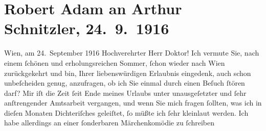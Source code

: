 

         
         \newcommand{\erwaehntePersonen}{Personen: Charles de Coster, Alexandre père Dumas,  G. Lenotre, Ricarda Huch, Viktor Franz Patzner}
         \newcommand{\erwaehnteOrte}{Orte: Wien}
         \newcommand{\erwaehnteWerke}{Werke: Bleus, Blancs et Rouges, Der große Krieg in Deutschland, Jean Christophe, Le mariage de Monsieur de Bréchard, Meine Memoiren, Märchenkomödie, Tyll Ulenspiegel und Lamm Goedzak}
               \section[Robert Adam an Arthur Schnitzler, 24. 9. 1916]{ Robert Adam an Arthur Schnitzler, 24. 9. 1916}\nopagebreak{}\rehead{ }\begin{ledgroupsized}[t]{13cm}\normalsize\beginnumbering \toendnotes[C]{\smallbreak\pagebreak[2]} 
\toendnotes[C]{\smallbreak}\pstart
           \raggedleft{}{\pb}Wien, am 24. September 1916\pend
           \pstart{}Hochverehrter Herr Doktor!\pend\pstart
           Ich vermute Sie, nach einem ſchönen und erholungsreichen Sommer, ſchon wieder
                    nach Wien zurückgekehrt und bin, Ihrer
                    liebenswürdigen Erlaubnis eingedenk, auch schon unbeſcheiden genug, anzufragen,
                    ob ich Sie einmal durch einen Beſuch ſtören darf?\pend
           \pstart
           Mir iſt die Zeit ſeit Ende meines Urlaubs unter unausgeſetzter und ſehr
                    anſtrengender Amtsarbeit vergangen, und wenn Sie mich fragen ſollten, was ich in
                    dieſen Monaten Dichteriſches geleiſtet, ſo müßte ich ſehr kleinlaut werden. Ich
                    habe allerdings an einer {\pb}ſonderbaren Märchenkomödie zu ſchreiben

\end{ledgroupsized}
